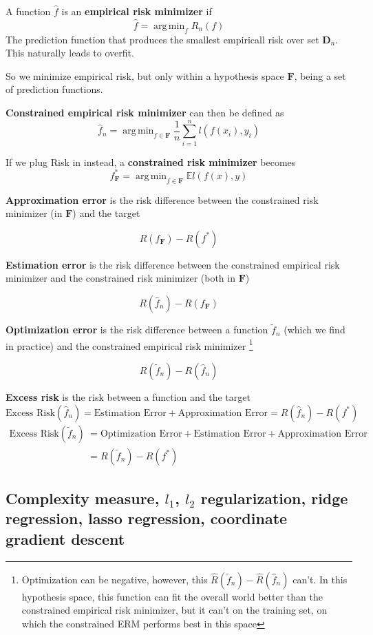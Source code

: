 \documentclass{article}
\DeclareMathOperator*{\argmin}{arg\,min}
\begin{document}
A function $\hat{f}$ is an \textbf{empirical risk minimizer} if
$$
\hat{f} = \argmin_{f}{\hat{R}_n(f)}
$$
The prediction function that produces the smallest empiricall risk over set $\mathbf{D}_n$.
This naturally leads to overfit.

So we minimize empirical risk, but only within a hypothesis space $\mathbf{F}$, being a set of prediction functions.

\textbf{Constrained empirical risk minimizer} can then be defined as
$$
\hat{f}_n = \argmin_{f \in \mathbf{F}}{\frac{1}{n} \sum_{i = 1}^{n}{\mathit{l}(f(x_i), y_i)}}
$$

If we plug Risk in instead, a \textbf{constrained risk minimizer} becomes
$$
f^*_{\mathbf{F}} = \argmin_{f \in \mathbf{F}}{\mathbb{E}\mathit{l}(f(x), y)}
$$

\textbf{Approximation error} is the risk difference between the constrained risk minimizer (in $\mathbf{F}$) and the target

$$
R(f_{\mathbf{F}}) - R(f^*)
$$

\textbf{Estimation error} is the risk difference between the constrained empirical risk minimizer and the constrained risk minimizer (both in $\mathbf{F}$)

$$
R(\hat{f}_n) - R(f_{\mathbf{F}})
$$

\textbf{Optimization error} is the risk difference between a function $\tilde{f}_n$ (which we find in practice) and the constrained empirical risk minimizer
\footnote{Optimization can be negative, however, this $\hat{R}(\tilde{f}_n) - \hat{R}(\hat{f}_n)$ can't.
In this hypothesis space, this function can fit the overall world better than the constrained empirical risk minimizer, but it can't on the training set, on which the constrained ERM performs best in this space}

$$
R(\tilde{f}_n) - R(\hat{f}_n)
$$

\textbf{Excess risk} is the risk between a function and the target
$$
\text{Excess Risk}(\hat{f}_n) = \text{Estimation Error} + \text{Approximation Error} = R(\hat{f}_n) - R(f^*)
$$
\begin{align*}
\text{Excess Risk}(\tilde{f}_n) &= \text{Optimization Error} + \text{Estimation Error} + \text{Approximation Error} \\
                                &= R(\tilde{f}_n) - R(f^*)
\end{align*}

\subsection{Complexity measure, $\mathit{l}_1$, $\mathit{l}_2$ regularization, ridge regression, lasso regression, coordinate gradient descent}
\end{document}
